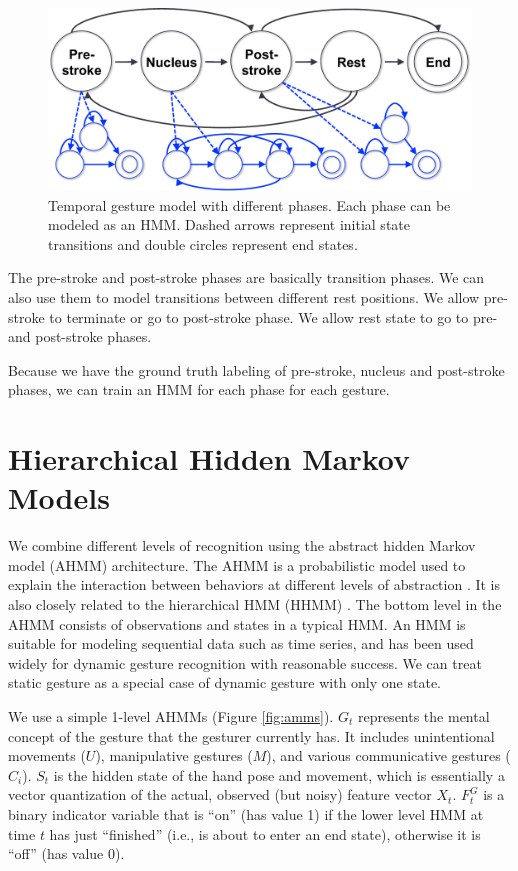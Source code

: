 \begin{figure}[tbh]
\centering
\includegraphics[clip, width=1\columnwidth]{figures/hmm.pdf}
\caption{Temporal gesture model with different phases. Each phase can be modeled as an HMM. Dashed arrows represent
initial state transitions and double circles
represent end states.}
\label{fig:hmm}
\end{figure}

The pre-stroke and post-stroke phases are basically transition phases. We
can also use them to model transitions between different rest positions. We
allow pre-stroke to terminate or go to post-stroke phase. We allow rest state to
go to pre- and post-stroke phases.

Because we have the ground truth labeling of pre-stroke, nucleus and post-stroke phases, 
we can train an HMM for each phase for each gesture. 

\section{Hierarchical Hidden Markov Models}
We combine different levels of recognition using the abstract hidden Markov
model (AHMM) architecture. The AHMM is a probabilistic model used to explain the
interaction between behaviors at different levels of abstraction \cite{johns05}.
It is also closely related to the hierarchical HMM (HHMM) \cite{fine98}. The bottom level in the AHMM 
consists of observations and states in a typical HMM. An HMM is suitable for 
modeling sequential data such as time series, and has been used widely for 
dynamic gesture recognition with reasonable success. We can treat static gesture 
as a special case of dynamic gesture with only one state.

We use a simple 1-level AHMMs \cite{murphy02} (Figure
\ref{fig:amms}). $G_t$ represents the mental concept of the gesture that the
gesturer currently has. It includes unintentional movements ($U$), manipulative
gestures ($M$), and various communicative gestures ($C_i$). $S_t$ is the hidden
state of the hand pose and movement, which is essentially a vector quantization of the actual, observed 
(but noisy) feature vector $X_t$. $F_t^G$ is a binary indicator variable that is
``on'' (has value 1) if the lower level HMM at time $t$ has just ``finished''
(i.e., is about to enter an end state), otherwise it is ``off'' (has value 0).

